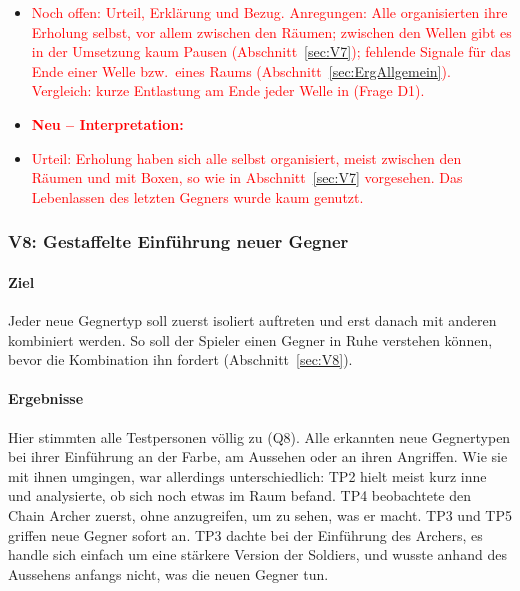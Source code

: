 \documentclass[../Main.tex]{subfiles}
\begin{document}
\begin{itemize}[leftmargin=1.5cm]
    \item \textcolor{red}{Noch offen: Urteil, Erklärung und Bezug. Anregungen: Alle organisierten ihre Erholung selbst, vor allem zwischen den Räumen; zwischen den Wellen gibt es in der Umsetzung kaum Pausen (Abschnitt~\ref{sec:V7}); fehlende Signale für das Ende einer Welle bzw.\ eines Raums (Abschnitt~\ref{sec:ErgAllgemein}). Vergleich: kurze Entlastung am Ende jeder Welle in  (Frage D1).}
\end{itemize}

\begin{itemize}[leftmargin=1.5cm]
    \item \textcolor{red}{\textbf{Neu -- Interpretation:}}
    \item \textcolor{red}{Urteil: Erholung haben sich alle selbst organisiert, meist zwischen den Räumen und mit Boxen, so wie in Abschnitt~\ref{sec:V7} vorgesehen. Das Lebenlassen des letzten Gegners wurde kaum genutzt.}
\end{itemize}

\subsubsection{V8: Gestaffelte Einführung neuer Gegner}

\paragraph{Ziel}
Jeder neue Gegnertyp soll zuerst isoliert auftreten und erst danach mit anderen kombiniert werden. So soll der Spieler einen Gegner in Ruhe verstehen können, bevor die Kombination ihn fordert (Abschnitt~\ref{sec:V8}).

\paragraph{Ergebnisse}
Hier stimmten alle Testpersonen völlig zu (Q8). Alle erkannten neue Gegnertypen bei ihrer Einführung an der Farbe, am Aussehen oder an ihren Angriffen. Wie sie mit ihnen umgingen, war allerdings unterschiedlich: TP2 hielt meist kurz inne und analysierte, ob sich noch etwas im Raum befand. TP4 beobachtete den Chain Archer zuerst, ohne anzugreifen, um zu sehen, was er macht. TP3 und TP5 griffen neue Gegner sofort an. TP3 dachte bei der Einführung des Archers, es handle sich einfach um eine stärkere Version der Soldiers, und wusste anhand des Aussehens anfangs nicht, was die neuen Gegner tun.
\end{document}
